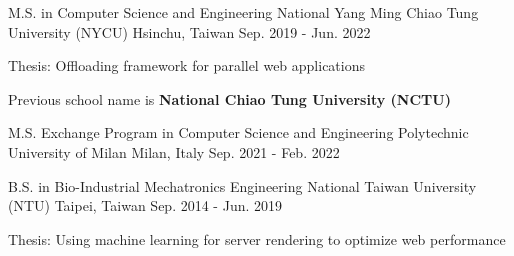

\begin{cventries}

  
\cventry
  {M.S. in Computer Science and Engineering} %
  {National Yang Ming Chiao Tung University (NYCU)} %
  {Hsinchu, Taiwan} %
  {Sep. 2019 - Jun. 2022} %
  {
    \begin{cvitems} %
      \item {Thesis: Offloading framework for parallel web applications}
      \item {Previous school name is \textbf{National Chiao Tung University (NCTU)}}
    \end{cvitems}
  }

\cventry
    {M.S. Exchange Program in Computer Science and Engineering} %
    {Polytechnic University of Milan} %
    {Milan, Italy} %
    {Sep. 2021 - Feb. 2022} %
    {
      \begin{cvitems} %
      \end{cvitems}
    }

  \cventry
    {B.S. in Bio-Industrial Mechatronics Engineering} %
    {National Taiwan University (NTU)} %
    {Taipei, Taiwan} %
    {Sep. 2014 - Jun. 2019} %
    {
      \begin{cvitems} %
        \item {Thesis: Using machine learning for server rendering to optimize web performance}
      \end{cvitems}
    }

\end{cventries}
